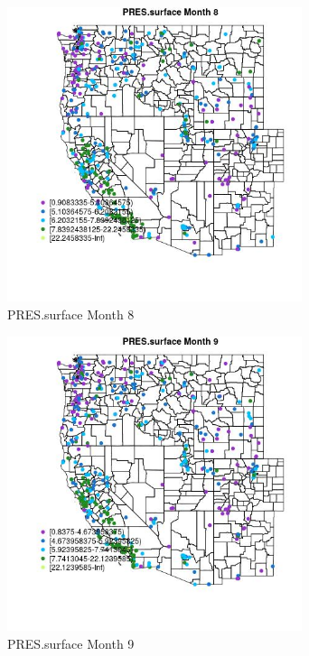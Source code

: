 \begin{figure} 
\centering  
\includegraphics[width=0.77\textwidth]{Code_Outputs/ML_input_report_ML_input_PM25_Step5_part_d_de_duplicated_aves_ML_input_MapObsMo8PRESsurface.jpg} 
\caption{\label{fig:ML_input_report_ML_input_PM25_Step5_part_d_de_duplicated_aves_ML_inputMapObsMo8PRESsurface}PRES.surface Month 8} 
\end{figure} 
 

\begin{figure} 
\centering  
\includegraphics[width=0.77\textwidth]{Code_Outputs/ML_input_report_ML_input_PM25_Step5_part_d_de_duplicated_aves_ML_input_MapObsMo9PRESsurface.jpg} 
\caption{\label{fig:ML_input_report_ML_input_PM25_Step5_part_d_de_duplicated_aves_ML_inputMapObsMo9PRESsurface}PRES.surface Month 9} 
\end{figure} 
 

